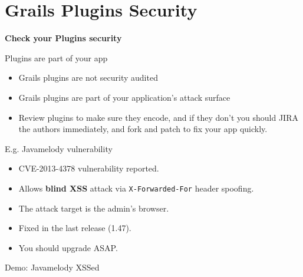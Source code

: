 
\section{Grails Plugins Security}

{
\begin{frame}[plain]
    \begin{center}
      \Huge\bfseries
      Check your Plugins security
    \end{center}
\end{frame}
}

\begin{frame}[plain]{Plugins are part of your app}
  \begin{itemize}%
    \item Grails plugins are not security audited
    \item Grails plugins are part of your application's attack surface
    \item Review plugins to make sure they encode, and if they don't you should JIRA the authors immediately, and fork and patch to fix your app quickly.
  \end{itemize}
\end{frame}

\begin{frame}{E.g. Javamelody vulnerability}
  \begin{itemize}%
    \item CVE-2013-4378 vulnerability reported.
    \item Allows \textbf{blind XSS} attack via \verb|X-Forwarded-For| header spoofing.
    \item The attack target is the admin's browser.
    \item Fixed in the last release (1.47).
    \item You should upgrade ASAP.
  \end{itemize}
\end{frame}

\begin{frame}{Demo: Javamelody XSSed}
  \begin{center}
  \end{center}
\end{frame}
